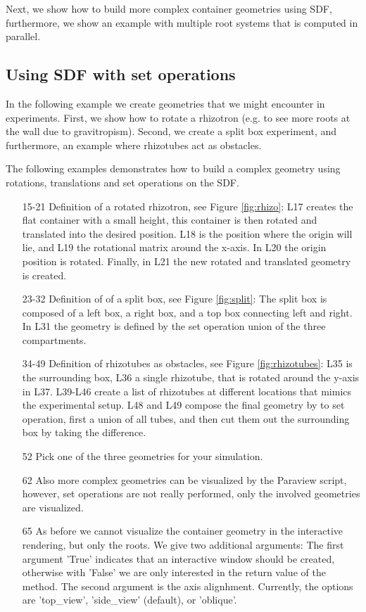 Next, we show how to build more complex container geometries using SDF, 
furthermore, we show an example with multiple root systems that is computed in parallel.

\subsection{Using SDF with set operations}

In the following example we create geometries that we might encounter in experiments. 
First, we show how to rotate a rhizotron (e.g. to see more roots at the wall due to gravitropism). 
Second, we create a split box experiment, and furthermore, an example where rhizotubes act as obstacles.

The following examples demonstrates how to build a complex geometry using rotations, translations and set operations on the SDF.



\begin{itemize}

\item[15-21] Definition of a rotated rhizotron, see Figure \ref{fig:rhizo}: 
L17 creates the flat container with a small height, this container is then rotated and translated into the desired position. 
L18 is the position where the origin will lie, and L19 the rotational matrix around the x-axis. 
In L20 the origin position is rotated. Finally, in L21 the new rotated and translated geometry is created. 
\item[23-32] Definition of of a split box, see Figure \ref{fig:split}: 
The split box is composed of a left box, a right box, and a top box connecting left and right. 
In L31 the geometry is defined by the set operation union of the three compartments. 
\item[34-49] Definition of rhizotubes as obstacles, see Figure \ref{fig:rhizotubes}: L35 is the surrounding box, 
L36 a single rhizotube, that is rotated around the y-axis in L37. 
L39-L46 create a list of rhizotubes at different locations that mimics the experimental setup. 
L48 and L49 compose the final geometry by to set operation, first a union of all tubes, 
and then cut them out the surrounding box by taking the difference. 
\item[52] Pick one of the three geometries for your simulation.
\item[62] Also more complex geometries can be visualized by the Paraview script, 
however, set operations are not really performed, only the involved geometries are visualized.
\item[65] As before we cannot visualize the container geometry in the interactive rendering, but only the roots. We give two additional arguments: The first argument 'True' indicates that an interactive window should be created, otherwise with 'False' we are only interested in the return value of the method. The second argument is the axis alignhment. Currently, the options are 'top\_view', 'side\_view' (default), or 'oblique'. 

\end{itemize}

